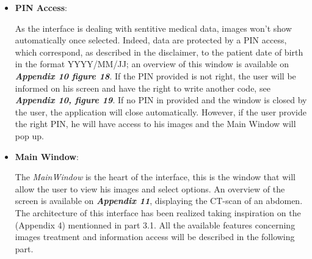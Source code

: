 \begin{itemize}
	 \clearpage
	
	\item \textbf{PIN Access}: 
	
	\newline \vspace{3mm} 
	
	As the interface is dealing with sentitive medical data, images won't show automatically once selected. Indeed, data are protected by a PIN access, which correspond, as described in the disclaimer, to the patient date of birth in the format YYYY/MM/JJ; an overview of this window is available on \textbf{\textit{Appendix 10 figure 18}}. If the PIN provided is not right, the user will be informed on his screen and have the right to write another code, see \textbf{\textit{Appendix 10, figure 19}}. If no PIN in provided and the window is closed by the user, the application will close automatically. However, if the user provide the right PIN, he will have access to his images and the Main Window will pop up.
	
	
	\item \textbf{Main Window}:
	
	\newline \vspace{3mm} 
	
	The \textit{MainWindow} is the heart of the interface, this is the window that will allow the user to view his images and select options. An overview of the screen is available on \textbf{\textit{Appendix 11}}, displaying the CT-scan of an abdomen. The architecture of this interface has been realized taking inspiration on the  (Appendix 4) mentionned in part 3.1. All the available features concerning images treatment and information access will be described in the following part.
		
	
\end{itemize}